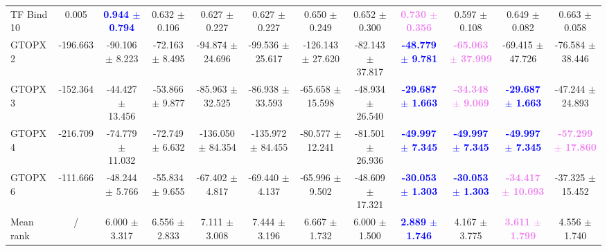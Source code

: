 \begin{table}[t!]
{\begin{tabular*}{\linewidth}{@{\extracolsep{\fill}}l|c|c|c|cccccccc@{}}
TF Bind 10 & 0.005 & \textbf{\textcolor{blue}{0.944 $\pm$ 0.794}} & 0.632 $\pm$ 0.106 & 0.627 $\pm$ 0.227 & 0.627 $\pm$ 0.227 & 0.650 $\pm$ 0.249 & 0.652 $\pm$ 0.300 & \textbf{\textcolor{violet}{0.730 $\pm$ 0.356}} & 0.597 $\pm$ 0.108 & 0.649 $\pm$ 0.082 & 0.663 $\pm$ 0.058 \\
GTOPX 2 & -196.663 & -90.106 $\pm$ 8.223 & -72.163 $\pm$ 8.495 & -94.874 $\pm$ 24.696 & -99.536 $\pm$ 25.617 & -126.143 $\pm$ 27.620 & -82.143 $\pm$ 37.817 & \textbf{\textcolor{blue}{-48.779 $\pm$ 9.781}} & \textbf{\textcolor{violet}{-65.063 $\pm$ 37.999}} & -69.415 $\pm$ 47.726 & -76.584 $\pm$ 38.446 \\
GTOPX 3 & -152.364 & -44.427 $\pm$ 13.456 & -53.866 $\pm$ 9.877 & -85.963 $\pm$ 32.525 & -86.938 $\pm$ 33.593 & -65.658 $\pm$ 15.598 & -48.934 $\pm$ 26.540 & \textbf{\textcolor{blue}{-29.687 $\pm$ 1.663}} & \textbf{\textcolor{violet}{-34.348 $\pm$ 9.069}} & \textbf{\textcolor{blue}{-29.687 $\pm$ 1.663}} & -47.244 $\pm$ 24.893 \\
GTOPX 4 & -216.709 & -74.779 $\pm$ 11.032 & -72.749 $\pm$ 6.632 & -136.050 $\pm$ 84.354 & -135.972 $\pm$ 84.455 & -80.577 $\pm$ 12.241 & -81.501 $\pm$ 26.936 & \textbf{\textcolor{blue}{-49.997 $\pm$ 7.345}} & \textbf{\textcolor{blue}{-49.997 $\pm$ 7.345}} & \textbf{\textcolor{blue}{-49.997 $\pm$ 7.345}} & \textbf{\textcolor{violet}{-57.299 $\pm$ 17.860}} \\
GTOPX 6 & -111.666 & -48.244 $\pm$ 5.766 & -55.834 $\pm$ 9.655 & -67.402 $\pm$ 4.817 & -69.440 $\pm$ 4.137 & -65.996 $\pm$ 9.502 & -48.609 $\pm$ 17.321 & \textbf{\textcolor{blue}{-30.053 $\pm$ 1.303}} & \textbf{\textcolor{blue}{-30.053 $\pm$ 1.303}} & \textbf{\textcolor{violet}{-34.417 $\pm$ 10.093}} & -37.325 $\pm$ 15.452 \\
\midrule
Mean rank & / & 6.000 $\pm$ 3.317 & 6.556 $\pm$ 2.833 & 7.111 $\pm$ 3.008 & 7.444 $\pm$ 3.196 & 6.667 $\pm$ 1.732 & 6.000 $\pm$ 1.500 & \textbf{\textcolor{blue}{2.889 $\pm$ 1.746}} & 4.167 $\pm$ 3.775 & \textbf{\textcolor{violet}{3.611 $\pm$ 1.799}} & 4.556 $\pm$ 1.740 \\
\bottomrule
\end{tabular*}
}
\label{tab:max-ablation-sweep-w}
\end{table}
